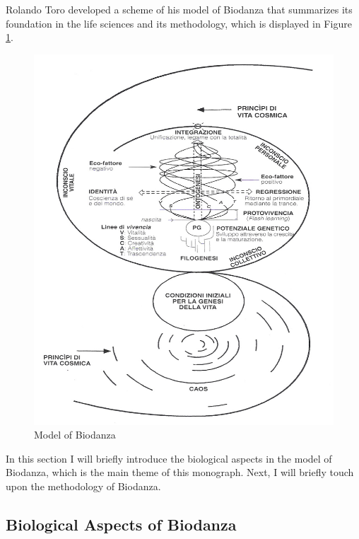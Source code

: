 \documentclass[
  11pt,
]{book}
\begin{document}
Rolando Toro developed a scheme of his model of Biodanza that summarizes its foundation in the life sciences and its methodology, which is displayed in Figure \ref{fig:model}.

\begin{figure}

{\centering \includegraphics[width=1\linewidth]{./figs/biodanzaModel} 

}

\caption{Model of Biodanza}\label{fig:model}
\end{figure}

In this section I will briefly introduce the biological aspects in the model of Biodanza, which is the main theme of this monograph. Next, I will briefly touch upon the methodology of Biodanza.

\hypertarget{biological-aspects-of-biodanza}{%
\subsection{Biological Aspects of Biodanza}\label{biological-aspects-of-biodanza}}
\end{document}
